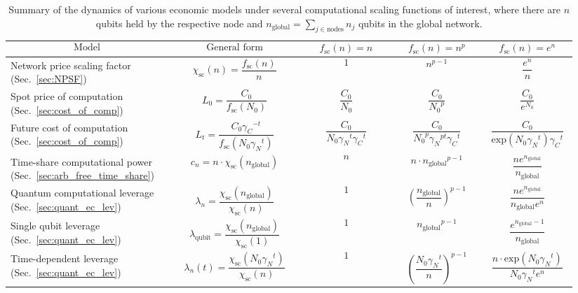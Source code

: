 \renewcommand{\tablename}{TABLE}
\renewcommand{\arraystretch}{0.5}

\begin{table}[!htb]
\caption{Summary of the dynamics of various economic models under several computational scaling functions of interest, where there are $n$ qubits held by the respective node and \mbox{$n_\text{global}=\sum_{j\in \text{nodes}} n_j$} qubits in the global network.} \label{tab:summary_ec_models}
\begin{tabular}{|p{0.255\linewidth}|p{0.22\linewidth}|p{0.155\linewidth}|p{0.155\linewidth}|p{0.155\linewidth}|}
	\hline
	\[\text{Model}\] & \[\text{General form}\] & \[f_\text{sc}(n)=n^{}\] & \[f_\text{sc}(n)=n^p\] & \[f_\text{sc}(n)=e^n\]\\
	\hline \hline
	Network price scaling factor (Sec.~\ref{sec:NPSF}) & \[\chi_\text{sc}(n)=\frac{f_\text{sc}(n)}{n}\] & \[1\] & \[n^{p-1}\] & \[\frac{e^n}{n}\]\\
	\hline
	Spot price of computation (Sec.~\ref{sec:cost_of_comp}) & \[L_0=\frac{C_0}{f_\text{sc}(N_0)}\] & \[\frac{C_0}{N_0}\] & \[\frac{C_0}{{N_0}^p}\] & \[\frac{C_0}{e^{N_0}}\]\\
	\hline
	Future cost of computation (Sec.~\ref{sec:cost_of_comp}) & \[L_t=\frac{C_0 {\gamma_C}^{-t}}{f_\text{sc}(N_0 {\gamma_N}^t)}
\] & \[\frac{C_0}{N_0{\gamma_N}^{t}{\gamma_C}^{t}}\] & \[\frac{C_0}{{N_0}^p{\gamma_N}^{pt}{\gamma_C}^t}\] & \[\frac{C_0}{\text{exp}(N_0{\gamma_N}^t){\gamma_C}^t}\]\\
	\hline
	Time-share computational power (Sec.~\ref{sec:arb_free_time_share}) & \[c_n=n \cdot \chi_\text{sc}(n_\text{global})
\] & \[n\] & \[n\cdot{n_\text{global}}^{p-1}\] & \[\frac{n e^{n_\text{global}}}{n_\text{global}}\]\\
	\hline
	Quantum computational leverage (Sec.~\ref{sec:quant_ec_lev}) & \[\lambda_n=\frac{\chi_\text{sc}(n_\text{global})}{\chi_\text{sc}(n)}\] & \[1\] & \[\left(\frac{n_\text{global}}{n}\right)^{p-1}\] & \[\frac{n e^{n_\text{global}}}{n_\text{global}e^n}\]\\
	\hline
	Single qubit leverage (Sec.~\ref{sec:quant_ec_lev}) & \[\lambda_\text{qubit}=\frac{\chi_\text{sc}(n_\text{global})}{\chi_\text{sc}(1)}\] & \[1\] & \[{n_\text{global}}^{p-1}\] & \[\frac{e^{n_\text{global}-1}}{n_\text{global}}\]\\
	\hline
	Time-dependent leverage (Sec.~\ref{sec:quant_ec_lev}) & \[\lambda_n(t)=\frac{\chi_\text{sc}(N_0{\gamma_N}^t)}{\chi_\text{sc}(n)}\] &  \[1\] & \[\left(\frac{N_0{\gamma_N}^t}{n}\right)^{p-1}\] & \[\frac{n \cdot \text{exp}(N_0{\gamma_N}^t)}{N_0{\gamma_N}^t e^n}\]\\

\end{tabular}
\end{table}
